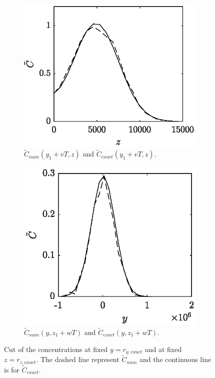 \begin{figure}[H]
	\centering
	\begin{subfigure}[b]{0.49\textwidth}
		\includegraphics[width=\textwidth]{fig/testcase/testcaseSI_fixedy.eps}
		\caption{$\tilde C_{num}(y_1+vT,z)$ and $\tilde C_{exact}(y_1+vT,z)$.}
		\label{fig:testcaseSI_fixedy}
	\end{subfigure}
	\begin{subfigure}[b]{0.49\textwidth}
		\includegraphics[width=\textwidth]{fig/testcase/testcaseSI_fixedz.eps}
		\caption{$\tilde C_{num}(y,z_1+wT)$ and $\tilde C_{exact}(y,z_1+wT)$.}
		\label{fig:testcaseSI_fixedz}
	\end{subfigure}
	\caption{Cut of the concentrations at fixed $y = r_{y,exact}$ and at fixed $z = r_{z,exact}$. The dashed line represent $\tilde C_{num}$ and the continuous line is for $\tilde C_{exact}$.}
\end{figure}